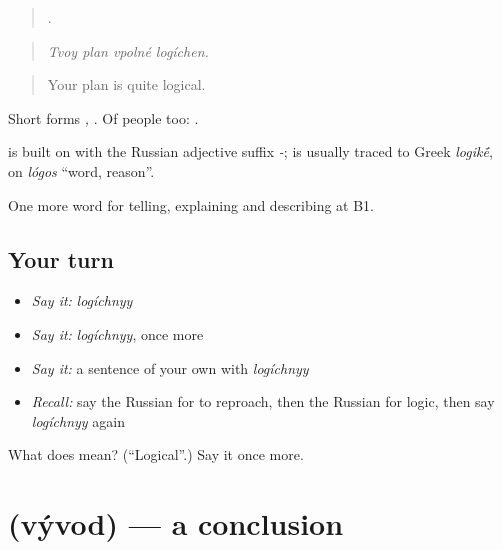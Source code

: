\begin{quote}
   .
\end{quote}

\begin{quote}
\emph{Tvoy plan vpolné logíchen.}
\end{quote}

\begin{quote}
Your plan is quite logical.
\end{quote}

Short forms \emph{, }. Of people too: \emph{ }.

\begin{cousinweb}
\textbf{} is built on \emph{} with the Russian adjective suffix \emph{-}; \emph{} is usually traced to Greek \emph{logik\'{\={e}}}, on \emph{lógos} \textquotedblleft{}word, reason\textquotedblright{}.
\end{cousinweb}

\begin{grammarlens}[title={What you've built}]
One more word for telling, explaining and describing at B1.
\end{grammarlens}

\subsection*{Your turn}
\begin{itemize}
\raggedright
  \item \emph{Say it:} \emph{logíchnyy}
  \item \emph{Say it:} \emph{logíchnyy}, once more
  \item \emph{Say it:} a sentence of your own with \emph{logíchnyy}
  \item \emph{Recall:} say the Russian for to reproach, then the Russian for logic, then say \emph{logíchnyy} again
\end{itemize}

\begin{tcolorbox}[breakable,colback=teal!4,colframe=teal!35!black,title={Before you move on}]
What does  mean? (\textquotedblleft{}Logical\textquotedblright{}.) Say it once more.
\end{tcolorbox}
\section[\texorpdfstring{\ru{вывод} (vývod)}{вывод (vývod)}]{ (vývod) — a conclusion}

